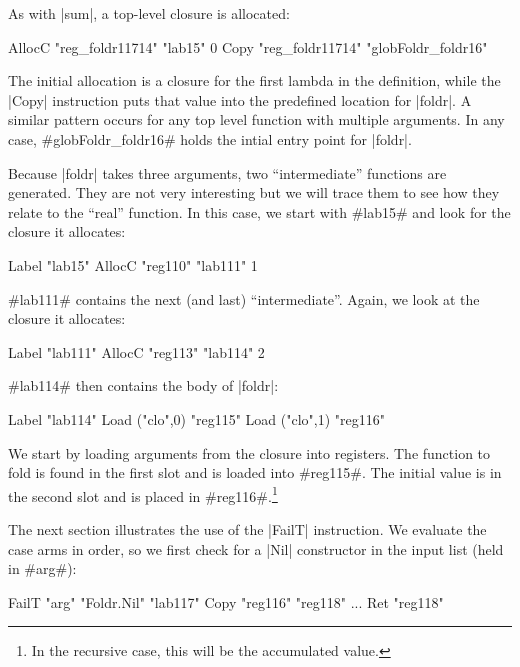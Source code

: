 \documentclass[11pt]{article}
\begin{document}
\noindent
As with |sum|, a top-level closure is allocated:

\begin{code}
  AllocC "reg_foldr11714" "lab15" 0
  Copy "reg_foldr11714" "globFoldr_foldr16"
\end{code}

\noindent
The initial allocation is a closure for the first lambda in the
definition, while the |Copy| instruction puts that value into the
predefined location for |foldr|. A similar pattern occurs for any top
level function with multiple arguments. In any case,
#globFoldr_foldr16# holds the intial entry point for |foldr|. 

Because |foldr| takes three arguments, two ``intermediate'' functions
are generated. They are not very interesting but we will trace them to
see how they relate to the ``real'' function. In this case, we start
with #lab15# and look for the closure it allocates:

\begin{code}
  Label "lab15"
  AllocC "reg110" "lab111" 1
\end{code}

\noindent
#lab111# contains the next (and last) ``intermediate''. Again, we look
at the closure it allocates:

\begin{code}
  Label "lab111"
  AllocC "reg113" "lab114" 2
\end{code}

\noindent
#lab114# then contains the body of |foldr|:

\begin{code}
  Label "lab114"
  Load ("clo",0) "reg115"
  Load ("clo",1) "reg116"
\end{code}

We start by loading arguments from the closure into registers. The
function to fold is found in the first slot and is loaded into
#reg115#. The initial value is in the second slot and is placed in
#reg116#.\footnote{In the recursive case, this will be the accumulated
  value.} 

The next section illustrates the use of the |FailT| instruction. We
evaluate the case arms in order, so we first check for a |Nil|
constructor in the input list (held in #arg#):

\begin{code}
  FailT "arg" "Foldr.Nil" "lab117"
  Copy "reg116" "reg118"
  ...
  Ret "reg118"
\end{code}
\end{document}
